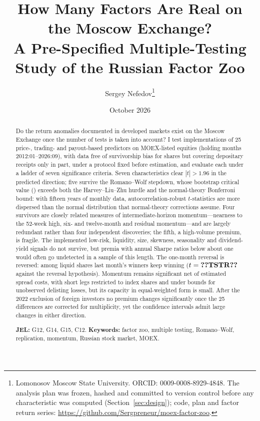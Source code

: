 \documentclass[11pt]{article}
\title{How Many Factors Are Real on the Moscow Exchange?\\[4pt]
\large A Pre-Specified Multiple-Testing Study of the Russian Factor Zoo}
\author{Sergey Nefedov\thanks{Lomonosov Moscow State University. ORCID: 0009-0008-8929-4848.
The analysis plan was frozen, hashed and committed to version control before any characteristic was computed
(Section~\ref{sec:design}); code, plan and factor return series: \url{https://github.com/Sergpreneur/moex-factor-zoo}.}}
\date{October 2026}
\newcommand{\RW}{Romano--Wolf}
\begin{document}
\maketitle
\thispagestyle{empty}

\begin{abstract}
\noindent
Do the return anomalies documented in developed markets exist on the Moscow Exchange once the number of tests is
taken into account? I test implementations of 25 price-, trading- and payout-based predictors on MOEX-listed equities (holding
months 2012:01--2026:09), with data free of survivorship bias for shares but covering depositary receipts only in part,
under a protocol fixed before estimation, and evaluate each under
a ladder of seven significance criteria. Seven characteristics clear $|t|>1.96$ in the predicted direction; five
survive the \RW{} stepdown, whose bootstrap critical value () exceeds both the Harvey--Liu--Zhu hurdle
and the normal-theory Bonferroni bound: with fifteen years of monthly data, autocorrelation-robust $t$-statistics are
more dispersed than the normal distribution that normal-theory corrections assume. Four survivors are closely related
measures of intermediate-horizon momentum---nearness to the 52-week high, six- and twelve-month and residual
momentum---and are largely redundant rather than four independent discoveries; the fifth, a high-volume premium, is
fragile. The implemented
low-risk, liquidity, size, skewness, seasonality and dividend-yield signals do not survive, but premia with annual Sharpe
ratios below about one would often go undetected in a sample of this length. The one-month reversal is reversed: among
liquid shares last month's winners keep winning ($t=\val{TSTR}$ against the reversal hypothesis). Momentum remains
significant net of estimated spread costs, with short legs restricted to index shares and under bounds for unobserved
delisting losses, but its capacity in equal-weighted form is small. After the 2022 exclusion of foreign investors no
premium changes significantly once the 25 differences are corrected for multiplicity, yet the confidence intervals
admit large changes in either direction.

\medskip\noindent
\textbf{JEL:} G12, G14, G15, C12. \quad
\textbf{Keywords:} factor zoo, multiple testing, Romano--Wolf, replication, momentum, Russian stock market, MOEX.
\end{abstract}
\end{document}
